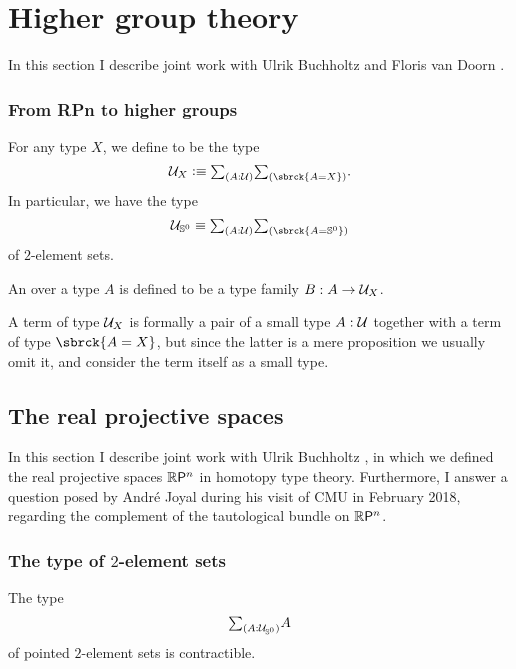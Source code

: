 \chapter{Higher group theory}
In this section I describe joint work with Ulrik Buchholtz and Floris van Doorn \cite{highergroups}.

\subsection{From RPn to higher groups}
\begin{defn}
For any type $X$, we define  to be the type \[\UU_X\defeq\sm{A:\UU}\sbrck{A=X}.\] In particular, we have the type \[\UU_{\sphere{0}}\jdeq\sm{A:\UU}\sbrck{A={\sphere{0}}}\] of $2$\nobreakdash-element sets.

An  over a type $A$ is defined to be a type family $B:A\to\mathcal{U}_X$. 
\end{defn}

A term of type $\mathcal{U}_X$ is formally a pair of a small type $A:\mathcal{U}$ together with a term of type $\sbrck{A=X}$, but since the latter is a mere proposition we usually omit it, and consider the term itself as a small type.

\section{The real projective spaces}
In this section I describe joint work with Ulrik Buchholtz \cite{realprojective}, in which we defined the real projective spaces $\mathbb{R}\mathsf{P}^{n}$ in homotopy type theory. Furthermore, I answer a question posed by André Joyal during his visit of CMU in February 2018, regarding the complement of the tautological bundle on $\mathbb{R}\mathsf{P}^{n}$.

\subsection{The type of $2$-element sets}
\begin{thm}\label{thm:ptd_2elt_sets}
The type
\begin{equation*}
\sm{A:\UU_{\sphere{0}}}A
\end{equation*}
of pointed $2$\nobreakdash-element sets is contractible.
\end{thm}

